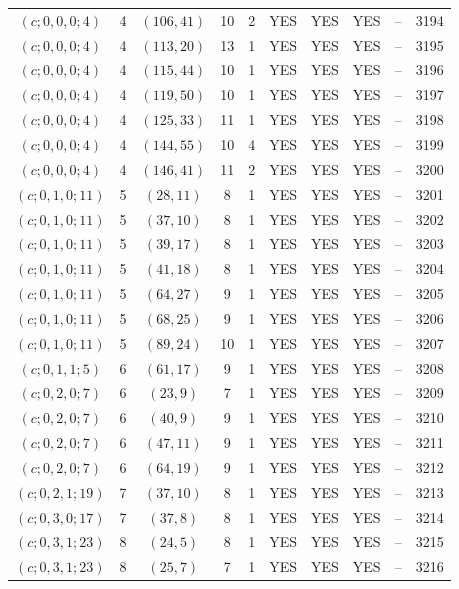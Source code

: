 \begin{longtable}{|c|c|c|c|c|c|c|c|c|c|}
$(c; 0, 0, 0; 4)$ & 4 & $(106, 41)$ & 10 & 2 & YES & YES & YES & -- & 3194\\
$(c; 0, 0, 0; 4)$ & 4 & $(113, 20)$ & 13 & 1 & YES & YES & YES & -- & 3195\\
$(c; 0, 0, 0; 4)$ & 4 & $(115, 44)$ & 10 & 1 & YES & YES & YES & -- & 3196\\
$(c; 0, 0, 0; 4)$ & 4 & $(119, 50)$ & 10 & 1 & YES & YES & YES & -- & 3197\\
$(c; 0, 0, 0; 4)$ & 4 & $(125, 33)$ & 11 & 1 & YES & YES & YES & -- & 3198\\
$(c; 0, 0, 0; 4)$ & 4 & $(144, 55)$ & 10 & 4 & YES & YES & YES & -- & 3199\\
$(c; 0, 0, 0; 4)$ & 4 & $(146, 41)$ & 11 & 2 & YES & YES & YES & -- & 3200\\
$(c; 0, 1, 0; 11)$ & 5 & $(28, 11)$ & 8 & 1 & YES & YES & YES & -- & 3201\\
$(c; 0, 1, 0; 11)$ & 5 & $(37, 10)$ & 8 & 1 & YES & YES & YES & -- & 3202\\
$(c; 0, 1, 0; 11)$ & 5 & $(39, 17)$ & 8 & 1 & YES & YES & YES & -- & 3203\\
$(c; 0, 1, 0; 11)$ & 5 & $(41, 18)$ & 8 & 1 & YES & YES & YES & -- & 3204\\
$(c; 0, 1, 0; 11)$ & 5 & $(64, 27)$ & 9 & 1 & YES & YES & YES & -- & 3205\\
$(c; 0, 1, 0; 11)$ & 5 & $(68, 25)$ & 9 & 1 & YES & YES & YES & -- & 3206\\
$(c; 0, 1, 0; 11)$ & 5 & $(89, 24)$ & 10 & 1 & YES & YES & YES & -- & 3207\\
$(c; 0, 1, 1; 5)$ & 6 & $(61, 17)$ & 9 & 1 & YES & YES & YES & -- & 3208\\
$(c; 0, 2, 0; 7)$ & 6 & $(23, 9)$ & 7 & 1 & YES & YES & YES & -- & 3209\\
$(c; 0, 2, 0; 7)$ & 6 & $(40, 9)$ & 9 & 1 & YES & YES & YES & -- & 3210\\
$(c; 0, 2, 0; 7)$ & 6 & $(47, 11)$ & 9 & 1 & YES & YES & YES & -- & 3211\\
$(c; 0, 2, 0; 7)$ & 6 & $(64, 19)$ & 9 & 1 & YES & YES & YES & -- & 3212\\
$(c; 0, 2, 1; 19)$ & 7 & $(37, 10)$ & 8 & 1 & YES & YES & YES & -- & 3213\\
$(c; 0, 3, 0; 17)$ & 7 & $(37, 8)$ & 8 & 1 & YES & YES & YES & -- & 3214\\
$(c; 0, 3, 1; 23)$ & 8 & $(24, 5)$ & 8 & 1 & YES & YES & YES & -- & 3215\\
$(c; 0, 3, 1; 23)$ & 8 & $(25, 7)$ & 7 & 1 & YES & YES & YES & -- & 3216\\

\end{longtable}
